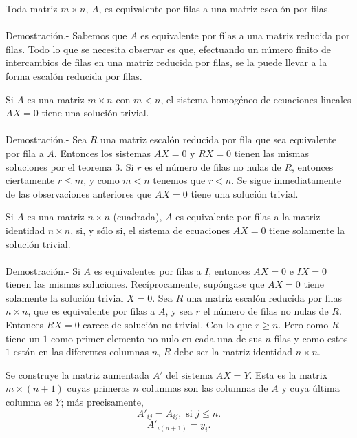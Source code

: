 \begin{teo}
    Toda matriz $m\times n$, $A$, es equivalente por filas a una matriz escalón por filas.\\\\
	Demostración.-\; Sabemos que $A$ es equivalente por filas a una matriz reducida por filas. Todo lo que se necesita observar es que, efectuando un número finito de intercambios de filas en una matriz reducida por filas, se la puede llevar a la forma escalón reducida por filas.\\
\end{teo}

\begin{teo}
    Si $A$ es una matriz $m\times n$ con $m<n$, el sistema homogéneo de ecuaciones lineales $AX=0$ tiene una solución trivial.\\\\
	Demostración.-\; Sea $R$ una matriz escalón reducida por fila que sea equivalente por fila a $A$. Entonces los sistemas $AX=0$ y $RX=0$ tienen las mismas soluciones por el teorema 3. Si $r$ es el número de filas no nulas de $R$, entonces ciertamente $r\leq m$, y como $m<n$ tenemos que $r<n$. Se sigue inmediatamente de las observaciones anteriores que $AX=0$ tiene una solución trivial.\\
\end{teo}

\begin{teo}
    Si $A$ es una matriz $n\times n$ (cuadrada), $A$ es equivalente por filas a la matriz identidad $n\times n$, si, y sólo si, el sistema de ecuaciones $AX=0$ tiene solamente la solución trivial.\\\\
	Demostración.-\; Si $A$ es equivalentes por filas a $I$, entonces $AX=0$ e $IX=0$ tienen las mismas soluciones. Recíprocamente, supóngase que $AX=0$ tiene solamente la solución trivial $X=0$. Sea $R$ una matriz escalón reducida por filas $n\times n$, que es equivalente por filas a $A$, y sea $r$ el número de filas no nulas de $R$. Entonces $RX=0$ carece de solución no trivial. Con lo que $r\geq n.$ Pero como $R$ tiene un $1$ como primer elemento no nulo en cada una de sus $n$ filas y como estos $1$ están en las diferentes columnas $n$, $R$ debe ser la matriz identidad $n\times n$.\\
\end{teo}

Se construye la matriz aumentada $A'$ del sistema $AX=Y$. Esta es la matrix $m\times (n+1)$ cuyas primeras $n$ columnas son las columnas de $A$ y cuya última columna es $Y$; más precisamente,
$$A'_{ij}=A_{ij},\mbox{ si } j \leq n.$$
$$A'_{i(n+1)}=y_i.$$


